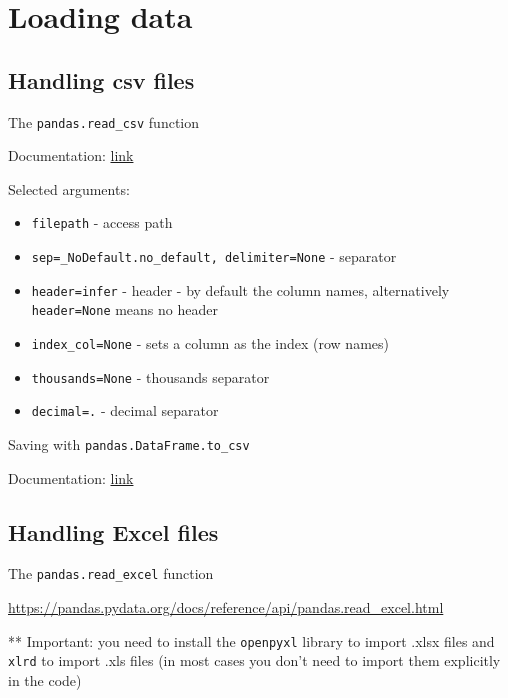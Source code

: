 \documentclass[
  english,
  letterpaper,
  DIV=11,
  numbers=noendperiod]{scrreprt}
\providecommand{\tightlist}{%
  \setlength{\itemsep}{0pt}\setlength{\parskip}{0pt}}
\begin{document}
\chapter{Loading data}\label{loading-data}

\section{Handling csv files}\label{handling-csv-files}

The \texttt{pandas.read\_csv} function

Documentation:
\href{https://pandas.pydata.org/pandas-docs/stable/reference/api/pandas.read_csv.html}{link}

Selected arguments:

\begin{itemize}
\tightlist
\item
  \texttt{filepath} - access path
\item
  \texttt{sep=\_NoDefault.no\_default,\ delimiter=None} - separator
\item
  \texttt{header=\textquotesingle{}infer\textquotesingle{}} - header -
  by default the column names, alternatively \texttt{header=None} means
  no header
\item
  \texttt{index\_col=None} - sets a column as the index (row names)
\item
  \texttt{thousands=None} - thousands separator
\item
  \texttt{decimal=\textquotesingle{}.\textquotesingle{}} - decimal
  separator
\end{itemize}

Saving with \texttt{pandas.DataFrame.to\_csv}

Documentation:
\href{https://pandas.pydata.org/pandas-docs/stable/reference/api/pandas.DataFrame.to_csv.html}{link}

\section{Handling Excel files}\label{handling-excel-files}

The \texttt{pandas.read\_excel} function

\url{https://pandas.pydata.org/docs/reference/api/pandas.read_excel.html}

** Important: you need to install the \texttt{openpyxl} library to
import .xlsx files and \texttt{xlrd} to import .xls files (in most cases
you don't need to import them explicitly in the code)
\end{document}
